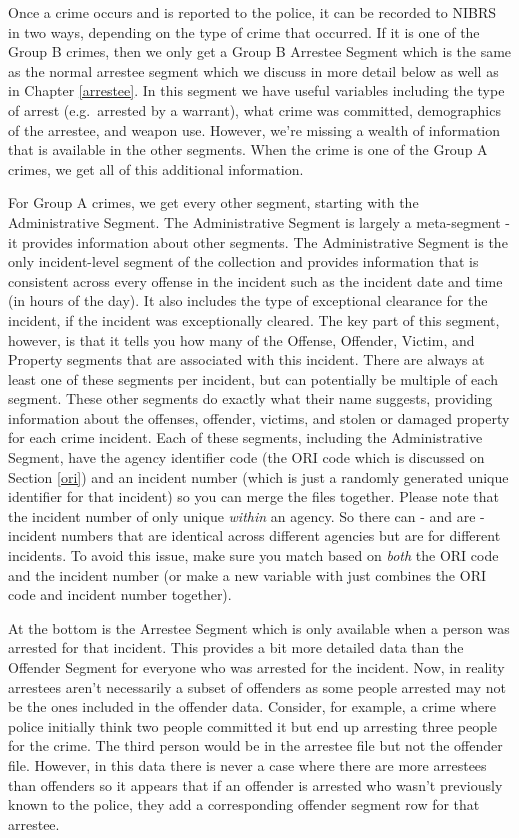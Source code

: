 \documentclass[
]{krantz}
\begin{document}
Once a crime occurs and is reported to the police, it can be
recorded to NIBRS in two ways, depending on the type of
crime that occurred. If it is one of the Group B crimes,
then we only get a Group B Arrestee Segment which is the
same as the normal arrestee segment which we discuss in more
detail below as well as in Chapter \ref{arrestee}. In this
segment we have useful variables including the type of
arrest (e.g.~arrested by a warrant), what crime was
committed, demographics of the arrestee, and weapon use.
However, we're missing a wealth of information that is
available in the other segments. When the crime is one of
the Group A crimes, we get all of this additional
information.

For Group A crimes, we get every other segment, starting
with the Administrative Segment. The Administrative Segment
is largely a meta-segment - it provides information about
other segments. The Administrative Segment is the only
incident-level segment of the collection and provides
information that is consistent across every offense in the
incident such as the incident date and time (in hours of the
day). It also includes the type of exceptional clearance for
the incident, if the incident was exceptionally cleared. The
key part of this segment, however, is that it tells you how
many of the Offense, Offender, Victim, and Property segments
that are associated with this incident. There are always at
least one of these segments per incident, but can
potentially be multiple of each segment. These other
segments do exactly what their name suggests, providing
information about the offenses, offender, victims, and
stolen or damaged property for each crime incident. Each of
these segments, including the Administrative Segment, have
the agency identifier code (the ORI code which is discussed
on Section \ref{ori}) and an incident number (which is just
a randomly generated unique identifier for that incident) so
you can merge the files together. Please note that the
incident number of only unique \emph{within} an agency. So
there can - and are - incident numbers that are identical
across different agencies but are for different incidents.
To avoid this issue, make sure you match based on
\emph{both} the ORI code and the incident number (or make a
new variable with just combines the ORI code and incident
number together).

At the bottom is the Arrestee Segment which is only
available when a person was arrested for that incident. This
provides a bit more detailed data than the Offender Segment
for everyone who was arrested for the incident. Now, in
reality arrestees aren't necessarily a subset of offenders
as some people arrested may not be the ones included in the
offender data. Consider, for example, a crime where police
initially think two people committed it but end up arresting
three people for the crime. The third person would be in the
arrestee file but not the offender file. However, in this
data there is never a case where there are more arrestees
than offenders so it appears that if an offender is arrested
who wasn't previously known to the police, they add a
corresponding offender segment row for that arrestee.
\end{document}
